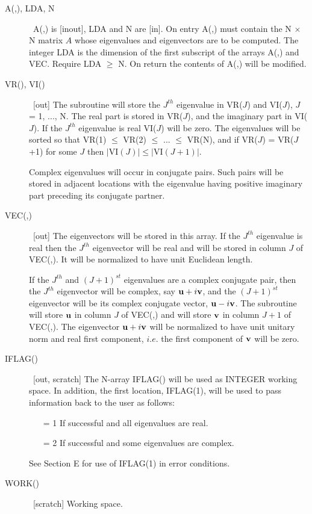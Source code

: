 \documentclass[twoside]{MATH77}
\begin{document}
\begin{description}
\item[A(,), LDA, N]  \ A(,) is [inout], LDA and N are [in]. On entry A(,) must
contain the N $\times $ N matrix $A$ whose eigenvalues and eigenvectors are to be
computed. The integer LDA is the dimension of the first subscript of the
arrays A(,) and VEC. Require LDA $\geq $ N. On return the contents
of A(,) will be modified.

\item[VR(), VI()]  \ [out] The subroutine will store the $J^{th}$ eigenvalue
in VR($J$) and VI($J$), $J$ = 1, ..., N. The real part is stored in VR($J$), and the
imaginary part in VI($J$). If the $J^{th}$ eigenvalue is real VI($J$) will be
zero. The eigenvalues will be sorted so that VR(1) $\leq $ VR(2) $\leq $ ...
$\leq$ VR(N), and if VR($J$) = VR($J$+1) for some $J$ then $|$VI$(J)|\leq
|$VI$(J+1)|.$

Complex eigenvalues will occur in conjugate pairs. Such pairs will be stored
in adjacent locations with the eigenvalue having positive imaginary part
preceding its conjugate partner.

\item[VEC(,)]  \ [out] The eigenvectors will be stored in this array. If the $%
J^{th}$ eigenvalue is real then the $J^{th}$ eigenvector will be real and
will be stored in column $J$ of VEC(,). It will be normalized to have unit
Euclidean length.

If the $J^{th}$ and $(J+1)^{st}$ eigenvalues are a complex conjugate pair,
then the $J^{th}$ eigenvector will be complex, say ${\bf u}+i{\bf v}$, and
the $(J+1)^{st}$ eigenvector will be its complex conjugate vector, ${\bf u}-i%
{\bf v}$. The subroutine will store ${\bf u}$ in column $J$ of VEC(,) and will
store ${\bf v}$ in column $J+1$ of VEC(,). The eigenvector ${\bf u}+i{\bf v}$
will be normalized to have unit unitary norm and real first component, $i.e
$. the first component of ${\bf v}$ will be zero.

\item[IFLAG()]  \ [out, scratch] The N-array IFLAG() will be used as INTEGER
working space. In addition, the first location, IFLAG(1), will be used to
pass information back to the user as follows:

\begin{itemize}
\item[= 1]  If successful and all eigenvalues are real.

\item[= 2]  If successful and some eigenvalues are complex.
\end{itemize}

See Section E for use of IFLAG(1) in error conditions.

\item[WORK()] \ [scratch] Working space.
\end{description}
\end{document}
